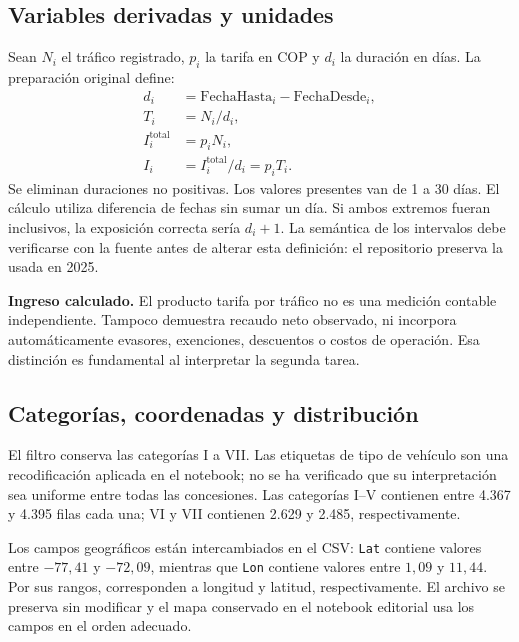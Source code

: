 \documentclass[11pt,a4paper]{article}
\newcommand{\campo}[1]{\nolinkurl{#1}}
\begin{document}
\subsection{Variables derivadas y unidades}
Sean $N_i$ el tráfico registrado, $p_i$ la tarifa en COP y $d_i$ la duración en días. La preparación original define:
\begin{align}
d_i &= \text{FechaHasta}_i-\text{FechaDesde}_i,\\
T_i &= N_i/d_i,\\
I_i^{\mathrm{total}} &= p_iN_i,\\
I_i &= I_i^{\mathrm{total}}/d_i=p_iT_i.
\end{align}
Se eliminan duraciones no positivas. Los valores presentes van de 1 a 30 días. El cálculo utiliza diferencia de fechas sin sumar un día. Si ambos extremos fueran inclusivos, la exposición correcta sería $d_i+1$. La semántica de los intervalos debe verificarse con la fuente antes de alterar esta definición: el repositorio preserva la usada en 2025.

\textbf{Ingreso calculado.} El producto tarifa por tráfico no es una medición contable independiente. Tampoco demuestra recaudo neto observado, ni incorpora automáticamente evasores, exenciones, descuentos o costos de operación. Esa distinción es fundamental al interpretar la segunda tarea.
\par\medskip

\subsection{Categorías, coordenadas y distribución}
El filtro conserva las categorías I a VII. Las etiquetas de tipo de vehículo son una recodificación aplicada en el notebook; no se ha verificado que su interpretación sea uniforme entre todas las concesiones. Las categorías I--V contienen entre 4.367 y 4.395 filas cada una; VI y VII contienen 2.629 y 2.485, respectivamente.

Los campos geográficos están intercambiados en el CSV: \campo{Lat} contiene valores entre $-77,41$ y $-72,09$, mientras que \campo{Lon} contiene valores entre $1,09$ y $11,44$. Por sus rangos, corresponden a longitud y latitud, respectivamente. El archivo se preserva sin modificar y el mapa conservado en el notebook editorial usa los campos en el orden adecuado.
\end{document}
